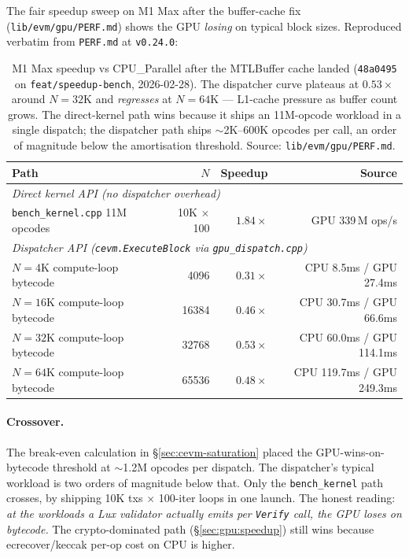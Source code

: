 The fair speedup sweep on M1 Max after the buffer-cache fix
(\texttt{lib/evm/gpu/PERF.md}) shows the GPU \emph{losing} on typical
block sizes. Reproduced verbatim from \texttt{PERF.md} at \texttt{v0.24.0}:

\begin{table}[h]
\centering
\small
\begin{tabular}{lrrr}
\toprule
\textbf{Path}                                   & \textbf{$N$}      & \textbf{Speedup} & \textbf{Source} \\
\midrule
\multicolumn{4}{l}{\textit{Direct kernel API (no dispatcher overhead)}} \\
\texttt{bench\_kernel.cpp} 11M opcodes          & 10K $\times$ 100  & $1.84\times$     & GPU 339\,M ops/s \\
\midrule
\multicolumn{4}{l}{\textit{Dispatcher API (\texttt{cevm.ExecuteBlock} via \texttt{gpu\_dispatch.cpp})}} \\
$N{=}4$K compute-loop bytecode                  & 4096              & $0.31\times$     & CPU 8.5ms / GPU 27.4ms \\
$N{=}16$K compute-loop bytecode                 & 16384             & $0.46\times$     & CPU 30.7ms / GPU 66.6ms \\
$N{=}32$K compute-loop bytecode                 & 32768             & $0.53\times$     & CPU 60.0ms / GPU 114.1ms \\
$N{=}64$K compute-loop bytecode                 & 65536             & $0.48\times$     & CPU 119.7ms / GPU 249.3ms \\
\bottomrule
\end{tabular}
\caption{M1 Max speedup vs CPU\_Parallel after the MTLBuffer cache
landed (\texttt{48a0495} on \texttt{feat/speedup-bench}, 2026-02-28).
The dispatcher curve plateaus at $0.53\times$ around $N=32$K and
\emph{regresses} at $N=64$K --- L1-cache pressure as buffer count
grows. The direct-kernel path wins because it ships an 11M-opcode
workload in a single dispatch; the dispatcher path ships
$\sim$2K--600K opcodes per call, an order of magnitude below the
amortisation threshold. Source: \texttt{lib/evm/gpu/PERF.md}.}
\label{tab:v024-perf-ceiling}
\end{table}

\paragraph{Crossover.} The break-even calculation in
\S\ref{sec:cevm-saturation} placed the GPU-wins-on-bytecode threshold
at $\sim$\num{1.2}M opcodes per dispatch. The dispatcher's typical
workload is two orders of magnitude below that. Only the
\texttt{bench\_kernel} path crosses, by shipping 10K txs $\times$
100-iter loops in one launch. The honest reading: \emph{at the
workloads a Lux validator actually emits per \texttt{Verify} call, the
GPU loses on bytecode.} The crypto-dominated path
(\S\ref{sec:gpu:speedup}) still wins because ecrecover/keccak per-op
cost on CPU is higher.

